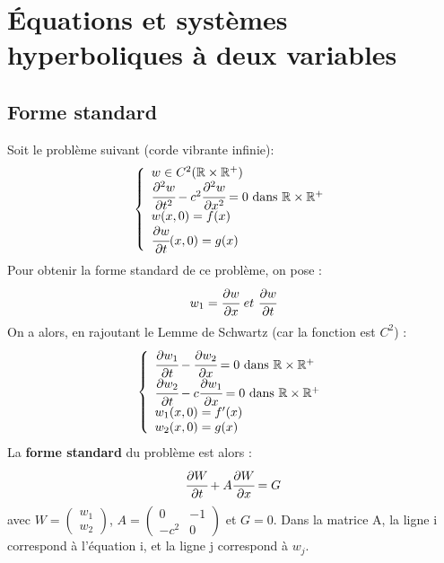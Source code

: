 \documentclass[french]{article}
\theoremstyle{definition}
\begin{document}
\section{Équations et systèmes hyperboliques à deux variables}
\subsection{Forme standard}
Soit le problème suivant (corde vibrante infinie):
$$
\left\{
\begin{array}{l}
	w \in C^2(\mathbb{R}\times\mathbb{R}^+)\\
	\cfrac{\partial^2 w}{\partial t^2} - c^2\cfrac{\partial^2 w}{\partial x^2} = 0\ \text{dans}\ \mathbb{R}\times\mathbb{R}^+\\
	w(x,0) = f(x)\\
	\cfrac{\partial w}{\partial t}(x,0) = g(x)
\end{array}
\right.
$$
Pour obtenir la forme standard de ce problème, on pose : 
$$w_1 = \cfrac{\partial w}{\partial x}\ et\ \cfrac{\partial w}{\partial t}$$
On a alors, en rajoutant le Lemme de Schwartz (car la fonction est $C^2$) :
$$
\left\{
\begin{array}{l}
	\cfrac{\partial w_1}{\partial t}-\cfrac{\partial w_2}{\partial x}=0\ \text{dans}\ \mathbb{R}\times\mathbb{R}^+\\
	\cfrac{\partial w_2}{\partial t} - c\cfrac{\partial w_1}{\partial x} = 0\ \text{dans}\ \mathbb{R}\times\mathbb{R}^+\\
	w_1(x,0) = f'(x)\\
	w_2(x,0) = g(x)
\end{array}
\right.
$$
La \textbf{forme standard} du problème est alors : 
$$\cfrac{\partial W}{\partial t} + A\cfrac{\partial W}{\partial x} = G$$
avec  $W = \begin{pmatrix}w_1\\w_2\end{pmatrix}$, $A = \begin{pmatrix}0 & -1\\-c^2 & 0\end{pmatrix}$ et $G=0$. Dans la matrice A, la ligne i correspond à l'équation i, et la ligne j correspond à $w_j$.
\end{document}
